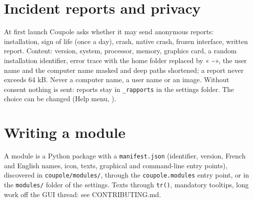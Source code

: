 \section{Incident reports and privacy}
At first launch Coupole asks whether it may send anonymous reports: installation, sign of life (once a day), crash,
native crash, frozen interface, written report. Content: version, system, processor, memory, graphics card, a random
installation identifier, error trace with the home folder replaced by « \textasciitilde », the user name and the
computer name masked and deep paths shortened; a report never exceeds 64 kB. Never a computer name, a user name or an
image. Without consent nothing is sent: reports stay
in \texttt{\_rapports} in the settings folder. The choice can be changed (Help menu, ).

\section{Writing a module}
A module is a Python package with a \texttt{manifest.json} (identifier, version, French and English names, icon,
texts, graphical and command-line entry points), discovered in \texttt{coupole/modules/}, through the
\texttt{coupole.modules} entry point, or in the \texttt{modules/} folder of the settings. Texts through \texttt{tr()},
mandatory tooltips, long work off the GUI thread: see CONTRIBUTING.md.

